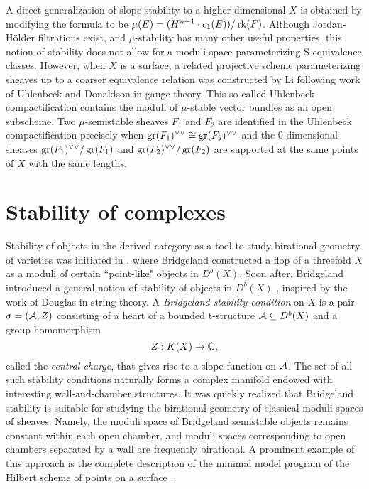 A direct generalization of slope-stability to a higher-dimensional $X$ is obtained by modifying the formula to be $\mu(E) = (H^{n-1} \cdot c_1(E))/\operatorname{\mathrm{rk}}(F)$. Although Jordan-H\"older filtrations exist, and $\mu$-stability has many other useful properties, this notion of stability does not allow for a moduli space parameterizing S-equivalence classes. However, when $X$ is a surface, a related projective scheme parameterizing sheaves up to a coarser equivalence relation was constructed by Li \cite{li} following work of Uhlenbeck and Donaldson in gauge theory. This so-called Uhlenbeck compactification contains the moduli of $\mu$-stable vector bundles as an open subscheme. Two $\mu$-semistable sheaves $F_1$ and $F_2$ are identified in the Uhlenbeck compactification precisely when $\operatorname{\mathrm{gr}}(F_1)^{\vee\vee} \cong \operatorname{\mathrm{gr}}(F_2)^{\vee\vee}$ and the 0-dimensional sheaves $\operatorname{\mathrm{gr}}(F_1)^{\vee\vee}/\operatorname{\mathrm{gr}}(F_1)$ and $\operatorname{\mathrm{gr}}(F_2)^{\vee\vee}/\operatorname{\mathrm{gr}}(F_2)$ are supported at the same points of $X$ with the same lengths. 

\section{Stability of complexes}
Stability of objects in the derived category as a tool to study birational geometry of varieties was initiated in \cite{bridgeland-flops}, where Bridgeland constructed a flop of a threefold $X$ as a moduli of certain ``point-like" objects in $D^b(X)$. Soon after, Bridgeland introduced a general notion of stability of objects in $D^b(X)$ \cite{bridgeland}, inspired by the work of Douglas in string theory. A \textit{Bridgeland stability condition} on $X$ is a pair $\sigma = (\mathcal{A}, Z)$ consisting of a heart of a bounded t-structure $\mathcal{A} \subseteq D^b(X)$ and a group homomorphism 
\[ Z: K(X) \to \mathbb{C}, \]
called the \textit{central charge}, that gives rise to a slope function on $\mathcal{A}$. The set of all such stability conditions naturally forms a complex manifold endowed with interesting wall-and-chamber structures. It was quickly realized that Bridgeland stability is suitable for studying the birational geometry of classical moduli spaces of sheaves. Namely, the moduli space of Bridgeland semistable objects remains constant within each open chamber, and moduli spaces corresponding to open chambers separated by a wall are frequently birational. A prominent example of this approach is the complete description of the minimal model program of the Hilbert scheme of points on a surface \cite{ABCH}. 

